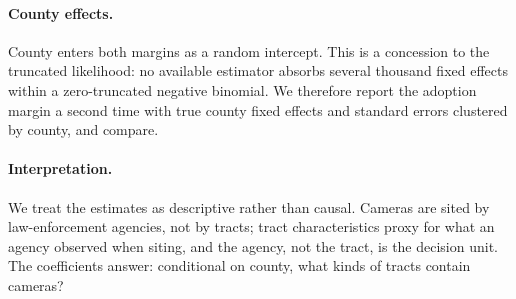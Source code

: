 \paragraph{County effects.} County enters both margins as a random intercept.
This is a concession to the truncated likelihood: no available estimator absorbs
several thousand fixed effects within a zero-truncated negative binomial. We
therefore report the adoption margin a second time with true county fixed
effects and standard errors clustered by county, and compare.

\paragraph{Interpretation.} We treat the estimates as descriptive rather than
causal. Cameras are sited by law-enforcement agencies, not by tracts; tract
characteristics proxy for what an agency observed when siting, and the agency,
not the tract, is the decision unit. The coefficients answer: conditional on
county, what kinds of tracts contain cameras?

